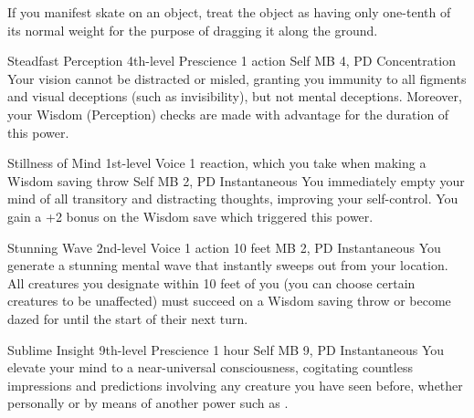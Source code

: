 If you manifest skate on an object,
treat the object as having only one-tenth of its normal weight
for the purpose of dragging it along the ground.

\DndPowerHeader%
  {Steadfast Perception}
  {4th-level Prescience}
  {1 action}
  {Self}
  {MB 4, PD \lvlfour}
  {Concentration}
Your vision cannot be distracted or misled,
granting you immunity to all figments and visual deceptions
(such as invisibility),
but not mental deceptions.
Moreover, your Wisdom (Perception) checks
are made with advantage for the duration of this power.

\DndPowerHeader%
  {Stillness of Mind}
  {1st-level Voice}
  {1 reaction, which you take when making a Wisdom saving throw}
  {Self}
  {MB 2, PD \lvlone}
  {Instantaneous}
You immediately empty your mind of all transitory and distracting thoughts,
improving your self-control.
You gain a +2 bonus on the Wisdom save which triggered this power.

\DndPowerHeader%
  {Stunning Wave}
  {2nd-level Voice}
  {1 action}
  {10 feet}
  {MB 2, PD \lvltwo}
  {Instantaneous}
You generate a stunning mental wave that instantly
sweeps out from your location.
All creatures you designate within 10 feet of you
(you can choose certain creatures to be unaffected)
must succeed on a Wisdom saving throw
or become dazed for until the start of their next turn.

\DndPowerHeader%
  {Sublime Insight}
  {9th-level Prescience}
  {1 hour}
  {Self}
  {MB 9, PD \lvlnine}
  {Instantaneous}
You elevate your mind to a near-universal consciousness,
cogitating countless impressions and predictions
involving any creature you have seen before,
whether personally or by means of another power
such as .

